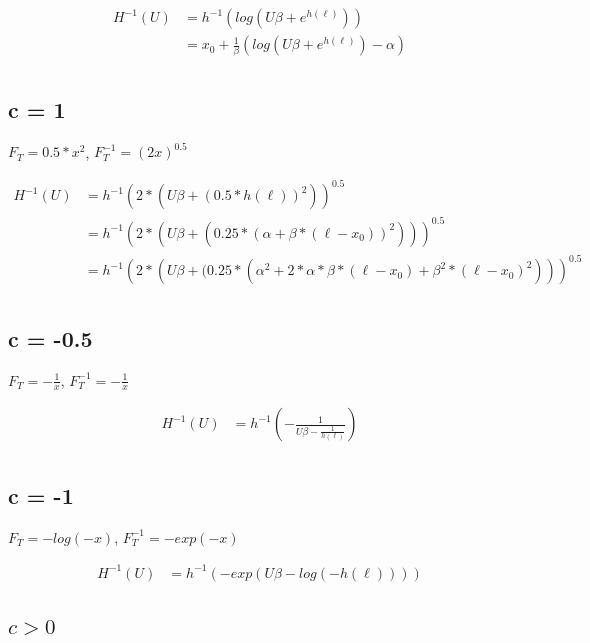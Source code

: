 \begin{align*}
H^{-1}(U) &= h^{-1} \left( log \left( U\beta + e^{h(\ell)} \right) \right) \\
		&= x_0 + \frac{1}{\beta} \left( log \left( U\beta + e^{h(\ell)} \right) - \alpha \right) \\
\end{align*}

\subsection{c = 1}

$F_T = 0.5 * x^2$, $F_T^{-1} = (2x)^{0.5}$

\begin{align*}
H^{-1}(U) &= h^{-1} \left( 2 * \left( U\beta + (0.5 *h(\ell))^{2} \right) \right)^{0.5} \\
		  &= h^{-1} \left( 2 * \left( U\beta + (0.25 * (\alpha + \beta * (\ell - x_0))^{2}) \right) \right)^{0.5} \\
		  &= h^{-1} \left( 2 * \left( U\beta + (0.25 * (\alpha^2 + 2 * \alpha * \beta * (\ell - x_0) + \beta^2 * (\ell - x_0)^{2}) \right) \right)^{0.5} \\
\end{align*}

\subsection{c = -0.5}

$F_T = -\frac{1}{x}$, $F_T^{-1} = - \frac{1}{x}$

\begin{align*}
H^{-1}(U) &= h^{-1} \left( - \frac{1}{U\beta - \frac{1}{h(\ell)}} \right) \\
\end{align*}


\subsection{c = -1}

$F_T =-log(-x)$, $F_T^{-1} = -exp(-x)$

\begin{align*}
H^{-1}(U) &= h^{-1} \left( - exp \left( U\beta - log(-h(\ell)) \right) \right) \\
\end{align*}


\subsection{$c > 0$}

